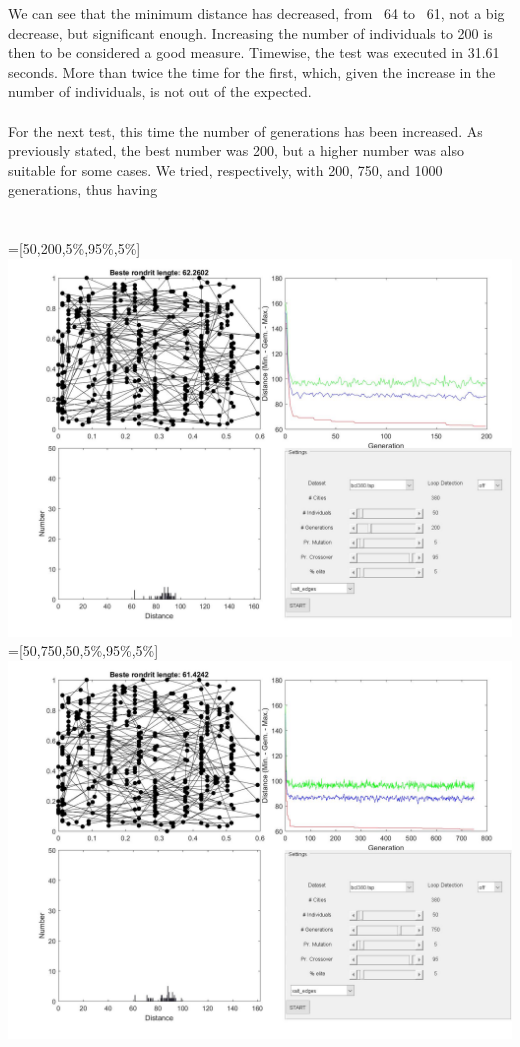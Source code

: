 We can see that the minimum distance has decreased, from ~64 to ~61, not a
big decrease, but significant enough. Increasing the number of
individuals to 200 is then to be considered a good measure. Timewise, the test was executed in 31.61 seconds. More than twice the time for the
first, which, given the increase in the number of individuals, is not out of
the expected. \\
\\
For the next test, this time the number of generations has been
increased. As previously stated, the best number was 200, but a higher number
was also suitable for some cases. We tried, respectively, with 200, 750, and
1000 generations, thus having\\
\\
\\
 =[50,200,5\%,95\%,5\%]\\
\includegraphics[width=\textwidth]{img/specific/xalt_edges/general_3.jpg}\\
 =[50,750,50,5\%,95\%,5\%] \\
\includegraphics[width=\textwidth]{img/specific/xalt_edges/general_4.jpg}\\
